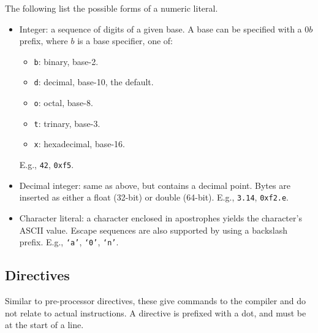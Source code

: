 \documentclass{article}
\begin{document}
The following list the possible forms of a numeric literal.

\begin{itemize}
    \item Integer: a sequence of digits of a given base.
    A base can be specified with a 0\(b\) prefix, where \(b\) is a base specifier, one of:
    \begin{itemize}
        \item \texttt{b}: binary, base-2.
        \item \texttt{d}: decimal, base-10, the default.
        \item \texttt{o}: octal, base-8.
        \item \texttt{t}: trinary, base-3.
        \item \texttt{x}: hexadecimal, base-16.
    \end{itemize}
    E.g., \texttt{42}, \texttt{0xf5}.
    \item Decimal integer: same as above, but contains a decimal point.
    Bytes are inserted as either a float (32-bit) or double (64-bit).
    E.g., \texttt{3.14}, \texttt{0xf2.e}.
    \item Character literal: a character enclosed in apostrophes yields the character's ASCII value.
    Escape sequences are also supported by using a backslash prefix.
    E.g., \texttt{`a'}, \texttt{`0'}, \texttt{`n'}.
\end{itemize}

\subsection{Directives}

Similar to pre-processor directives, these give commands to the compiler and do not relate to actual instructions.
A directive is prefixed with a dot, and must be at the start of a line.
\end{document}
